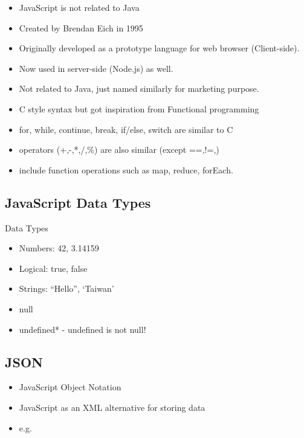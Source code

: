 \documentclass[]{book}
\providecommand{\tightlist}{%
  \setlength{\itemsep}{0pt}\setlength{\parskip}{0pt}}
\begin{document}
\begin{itemize}
\tightlist
\item
  JavaScript is not related to Java
\item
  Created by Brendan Eich in 1995
\item
  Originally developed as a prototype language for web browser (Client-side).
\item
  Now used in server-side (Node.js) as well.
\item
  Not related to Java, just named similarly for marketing purpose.
\item
  C style syntax but got inspiration from Functional programming
\item
  for, while, continue, break, if/else, switch are similar to C
\item
  operators (+,-,*,/,\%) are also similar (except ==,!=,\textbar\textbar)
\item
  include function operations such as map, reduce, forEach.
\end{itemize}

\hypertarget{javascript-data-types}{%
\subsection{JavaScript Data Types}\label{javascript-data-types}}

Data Types

\begin{itemize}
\tightlist
\item
  Numbers: 42, 3.14159
\item
  Logical: true, false
\item
  Strings: ``Hello'', `Taiwan'
\item
  null
\item
  undefined* - undefined is not null!
\end{itemize}

\hypertarget{json}{%
\subsection{JSON}\label{json}}

\begin{itemize}
\tightlist
\item
  JavaScript Object Notation
\item
  JavaScript as an XML alternative for storing data
\item
  e.g.
\end{itemize}
\end{document}
